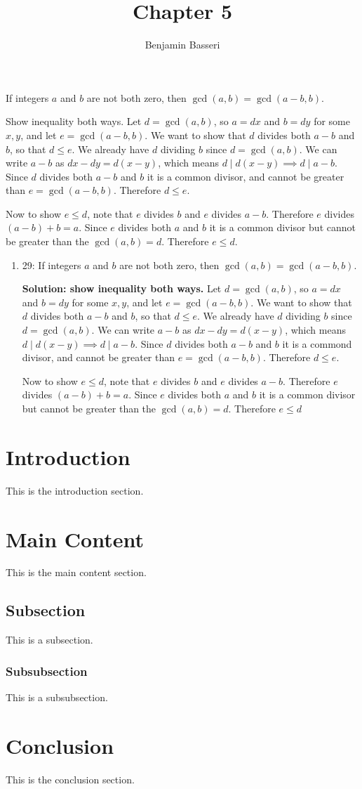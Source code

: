 \documentclass{article}
\title{Chapter 5}
\author{Benjamin Basseri}
\date{}
\begin{document}
\maketitle

\begin{problem}
If integers $a$ and $b$ are not both zero, then $\gcd(a,b)=\gcd(a-b,b)$.
\end{problem}

\begin{solution}

  Show inequality both ways. Let $d = \gcd(a, b)$, so $a = dx$ and $b = dy$ for some $x, y$, and let $e = \gcd(a - b, b)$. We want to show that $d$ divides both $a - b$ and $b$, so that $d \leq e$. We already have $d$ dividing $b$ since $d = \gcd(a, b)$. We can write $a - b$ as $dx - dy = d(x-y)$, which means $d\mid d(x-y) \implies d\mid a-b$. Since $d$ divides both $a-b$ and $b$ it is a common divisor, and cannot be greater than $e = \gcd(a-b, b)$. Therefore $d \leq e$.

  Now to show $e \leq d$, note that $e$ divides $b$ and $e$ divides $a - b$. Therefore $e$ divides $(a - b) + b = a$. Since $e$ divides both $a$ and $b$ it is a common divisor but cannot be greater than the $\gcd(a, b) = d$. Therefore $e \leq d$.
\end{solution}

\begin{enumerate}
  \item 29: If integers $a$ and $b$ are not both zero, then $\gcd(a,b)=\gcd(a-b,b)$.

        \textbf{Solution: show inequality both ways.} Let $d = \gcd(a, b)$, so $a = dx$ and $b = dy$ for some $x, y$, and let $e = \gcd(a - b, b)$. We want to show that $d$ divides both $a - b$ and $b$, so that $d \leq e$. We already have $d$ dividing $b$ since $d = \gcd(a, b)$. We can write $a - b$ as $dx - dy = d(x-y)$, which means $d\mid d(x-y) \implies d\mid a-b$. Since $d$ divides both $a-b$ and $b$ it is a commond divisor, and cannot be greater than $e = \gcd(a-b, b)$. Therefore $d \leq e$.

        Now to show $e \leq d$, note that $e$ divides $b$ and $e$ divides $a - b$. Therefore $e$ divides $(a - b) + b = a$. Since $e$ divides both $a$ and $b$ it is a common divisor but cannot be greater than the $\gcd(a, b) = d$. Therefore $e \leq d$
\end{enumerate}
\section{Introduction}
This is the introduction section.

\section{Main Content}
This is the main content section.

\subsection{Subsection}
This is a subsection.

\subsubsection{Subsubsection}
This is a subsubsection.

\section{Conclusion}
This is the conclusion section.
\end{document}
